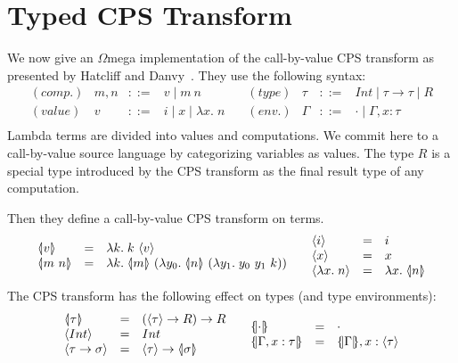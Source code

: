 \documentclass[10pt]{article}
\newcommand{\Wmega}{\ensuremath{\Omega}mega}
\begin{document}



\section{Typed CPS Transform}

\newcommand{\cpsC}[1]{\langle\hspace{-0.2em}\vert {#1} \vert\hspace{-0.2em}\rangle}
\newcommand{\cpsV}[1]{\langle {#1} \rangle}
\newcommand{\cpsE}[1]{\lbrace\hspace{-0.2em}\vert {#1} \vert\hspace{-0.2em}\rbrace}
\newcommand{\lam}[2]{\lambda {#1}.\; {#2}}

We now give an \Wmega{} implementation of the call-by-value CPS 
transform as presented by Hatcliff and Danvy~\cite{hatcliff-danvy-thunks}.
They use the following syntax:
\[
\begin{array}{llcl}
(comp.)& m, n & ::= & v \mid m\ n \\
(value) & v    & ::= & i \mid x \mid \lam{x}{n} \\
\end{array}
\quad
\begin{array}{llcl}
(type) & \tau & ::= & Int \mid \tau \to \tau \mid R \\
(env.) &  \Gamma&::=& \cdot \mid \Gamma, x:\tau \\
\end{array}
\]
Lambda terms are divided into values and computations.  
We commit here to a call-by-value source language by categorizing 
variables as values.  The type $R$ is a special type introduced by the 
CPS transform as the final result type of any computation.

Then they define a call-by-value CPS transform on terms.
\[
\begin{array}{lcl}
\cpsC{v}     &=& \lam{k}{k\ \cpsV{v}} \\
\cpsC{m\ n}  &=& \lam{k}{\cpsC{m}\ (\lam{y_0}{\cpsC{n}\ (\lam{y_1}{y_0\ y_1\ k})})} \\
\end{array}
\quad
\begin{array}{lcl}
\cpsV{i}     &=& i \\
\cpsV{x}     &=& x \\
\cpsV{\lam{x}{n}} &=& \lam{x}{\cpsC{n}} \\
\end{array}
\]
The CPS transform has the following effect on types (and type environments):
\[
\begin{array}{lcl}
\cpsC{\tau}    &=& (\cpsV{\tau} \to R) \to R \\
\cpsV{Int}     &=& Int \\
\cpsV{\tau \to \sigma}   &=& {\cpsV{\tau} \to \cpsC{\sigma}} \\
\end{array}
\quad
\begin{array}{lcl}
\cpsE{\cdot}   &=& \cdot \\
\cpsE{\Gamma,x:\tau} &=& \cpsE{\Gamma},x:\cpsV{\tau} \\
\end{array}
\]
\end{document}
